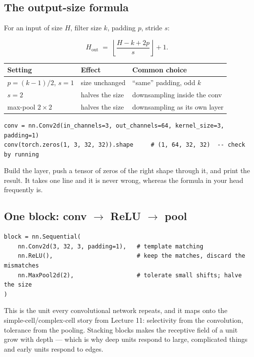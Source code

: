 \documentclass[11pt]{article}
\begin{document}
\subsection{The output-size formula}

For an input of size $H$, filter size $k$, padding $p$, stride $s$:

\[
H_{\text{out}} \;=\; \left\lfloor \frac{H - k + 2p}{s} \right\rfloor + 1 .
\]

\begin{center}
\begin{tabular}{@{}lll@{}}
\toprule
Setting & Effect & Common choice \\
\midrule
$p = (k-1)/2$, $s=1$ & size unchanged & ``same'' padding, odd $k$ \\
$s = 2$ & halves the size & downsampling inside the conv \\
max-pool $2\times2$ & halves the size & downsampling as its own layer \\
\bottomrule
\end{tabular}
\end{center}

\begin{lstlisting}
conv = nn.Conv2d(in_channels=3, out_channels=64, kernel_size=3, padding=1)
conv(torch.zeros(1, 3, 32, 32)).shape     # (1, 64, 32, 32)  -- check by running
\end{lstlisting}

\begin{keybox}
 Build the layer, push a tensor of zeros
of the right shape through it, and print the result. It takes one line and it is
never wrong, whereas the formula in your head frequently is.
\end{keybox}

\subsection{One block: conv $\to$ ReLU $\to$ pool}

\begin{lstlisting}
block = nn.Sequential(
    nn.Conv2d(3, 32, 3, padding=1),   # template matching
    nn.ReLU(),                        # keep the matches, discard the mismatches
    nn.MaxPool2d(2),                  # tolerate small shifts; halve the size
)
\end{lstlisting}

This is the unit every convolutional network repeats, and it maps onto the
simple-cell/complex-cell story from Lecture 11: selectivity from the
convolution, tolerance from the pooling. Stacking blocks makes the receptive
field of a unit grow with depth --- which is why deep units respond to large,
complicated things and early units respond to edges.
\end{document}
